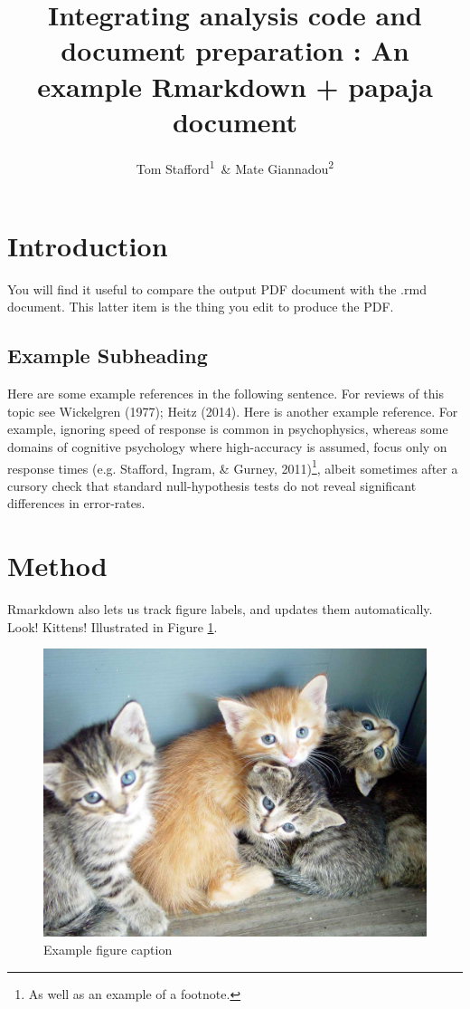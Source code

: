 \documentclass[floatsintext,jou]{apa6}
\title{Integrating analysis code and document preparation : An example
Rmarkdown + papaja document}
\author{Tom Stafford\textsuperscript{1}~\& Mate Giannadou\textsuperscript{2}}
\affiliation{
    \vspace{0.5cm}
          \textsuperscript{1} Department of Psychology, University of Sheffield\\
          \textsuperscript{2} Department of Psychosocial Science, University of Bergen  }
\theoremstyle{definition}
\theoremstyle{definition}
\theoremstyle{definition}
\theoremstyle{remark}
\begin{document}
\maketitle

\setcounter{secnumdepth}{0}



\section{Introduction}\label{introduction}

You will find it useful to compare the output PDF document with the .rmd
document. This latter item is the thing you edit to produce the PDF.

\subsection{Example Subheading}\label{example-subheading}

Here are some example references in the following sentence. For reviews
of this topic see Wickelgren (1977); Heitz (2014). Here is another
example reference. For example, ignoring speed of response is common in
psychophysics, whereas some domains of cognitive psychology where
high-accuracy is assumed, focus only on response times (e.g. Stafford,
Ingram, \& Gurney, 2011)\footnote{As well as an example of a footnote.},
albeit sometimes after a cursory check that standard null-hypothesis
tests do not reveal significant differences in error-rates.

\section{Method}\label{method}

Rmarkdown also lets us track figure labels, and updates them
automatically. Look! Kittens! Illustrated in Figure
\ref{fig:examplefigurename}.

\begin{figure}

{\centering \includegraphics[width=0.75\linewidth]{figs/kittens} 

}

\caption{Example figure caption}\label{fig:examplefigurename}
\end{figure}
\end{document}
